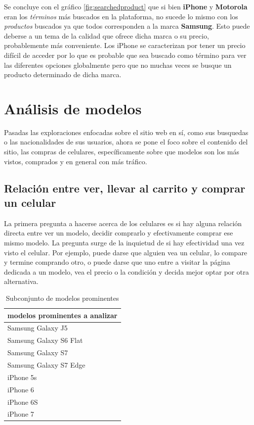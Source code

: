 \documentclass[a4paper]{article}
\begin{document}
Se concluye con el gráfico \ref{fig:searchedproduct} que si bien \textbf{iPhone} y \textbf{Motorola} eran los \textit{términos} más buscados en la plataforma, no sucede lo mismo con los \textit{productos} buscados ya que todos corresponden a la marca \textbf{Samsung}. Esto puede deberse a un tema de la calidad que ofrece dicha marca o su precio, probablemente más conveniente. Los iPhone se caracterizan por tener un precio difícil de acceder por lo que es probable que sea buscado como término para ver las diferentes opciones globalmente pero que no muchas veces se busque un producto determinado de dicha marca.

\section{Análisis de modelos} \label{modelo}

Pasadas las exploraciones enfocadas sobre el sitio web en sí, como sus busquedas o las nacionalidades de sus usuarios, ahora se pone el foco sobre el contenido del sitio, las compras de celulares, específicamente sobre que modelos son los más vistos, comprados y en general con más tráfico.

\subsection{Relación entre ver, llevar al carrito y comprar un celular}

La primera pregunta a hacerse acerca de los celulares es si hay alguna relación directa entre ver un modelo, decidir comprarlo y efectivamente comprar ese mismo modelo. La pregunta surge de la inquietud de si hay efectividad una vez visto el celular. Por ejemplo, puede darse que alguien vea un celular, lo compare y termine comprando otro, o puede darse que uno entre a visitar la página dedicada a un modelo, vea el precio o la condición y decida mejor optar por otra alternativa.

\begin{table}[h!]
	\begin{center}
		\begin{tabular}{|l|}
			\hline
			modelos prominentes a analizar \\
			\hline \hline
			Samsung Galaxy J5 \\ \hline
			Samsung Galaxy S6 Flat \\ \hline
			Samsung Galaxy S7 \\ \hline
			Samsung Galaxy S7 Edge \\ \hline
			iPhone 5s \\ \hline
			iPhone 6 \\ \hline
			iPhone 6S \\ \hline
			iPhone 7 \\ \hline
		\end{tabular}
		\caption{Subconjunto de modelos prominentes}
		\label{table:modelos_prominentes}
	\end{center}
\end{table}
\end{document}

